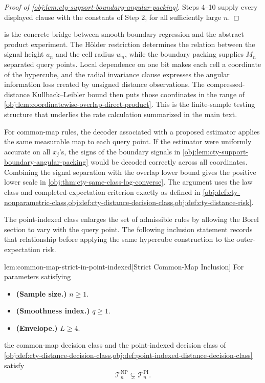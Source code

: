 \documentclass[11pt]{article}
\begin{document}
\begin{proof}[Proof of \cref{obj:lem:cty-support-boundary-angular-packing}]
Steps 4--10 supply every displayed clause with the constants of Step 2, for all sufficiently large \(n\).
\end{proof}

 is the concrete bridge between smooth boundary regression and the abstract product experiment. The Hölder restriction determines the relation between the signal height \(a_n\) and the cell radius \(w_n\), while the boundary packing supplies \(M_n\) separated query points. Local dependence on one bit makes each cell a coordinate of the hypercube, and the radial invariance clause expresses the angular information loss created by unsigned distance observations. The compressed-distance Kullback--Leibler bound then puts those coordinates in the range of \cref{obj:lem:coordinatewise-overlap-direct-product}. This is the finite-sample testing structure that underlies the rate calculation summarized in the main text.

For common-map rules, the decoder associated with a proposed estimator applies the same measurable map to each query point. If the estimator were uniformly accurate on all \(x_j\)'s, the signs of the boundary signals in \cref{obj:lem:cty-support-boundary-angular-packing} would be decoded correctly across all coordinates. Combining the signal separation with the overlap lower bound gives the positive lower scale in \cref{obj:thm:cty-same-class-log-converse}. The argument uses the law class and completed-expectation criterion exactly as defined in \cref{obj:def:cty-nonparametric-class,obj:def:cty-distance-decision-class,obj:def:cty-distance-risk}.

The point-indexed class enlarges the set of admissible rules by allowing the Borel section to vary with the query point. The following inclusion statement records that relationship before applying the same hypercube construction to the outer-expectation risk.

\begin{lemmav}{lem:common-map-strict-in-point-indexed}[Strict Common-Map Inclusion]
For parameters satisfying
\begin{itemize}
\item \textbf{(Sample size.)} \(n\geq 1\).
\item \textbf{(Smoothness index.)} \(q\geq 1\).
\item \textbf{(Envelope.)} \(L\geq 4\).
\end{itemize}
the common-map decision class and the point-indexed decision class of \cref{obj:def:cty-distance-decision-class,obj:def:point-indexed-distance-decision-class} satisfy
\[
\mathcal T_n^{\mathrm{NP}}\subsetneq \mathcal T_n^{\mathrm{PI}}.
\]
\end{lemmav}
\end{document}
